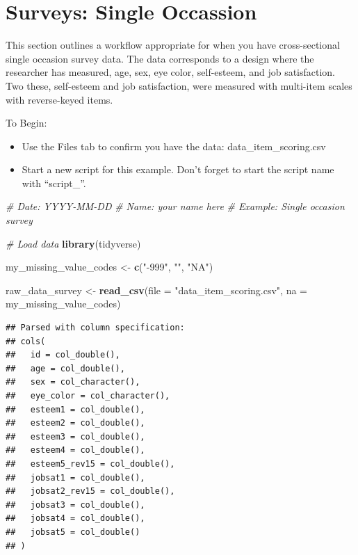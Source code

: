 \documentclass[
]{krantz}
\makeatletter
\newenvironment{Shaded}{\begin{snugshade}}{\end{snugshade}}
\newcommand{\CommentTok}[1]{\textcolor[rgb]{0.37,0.37,0.37}{\textit{#1}}}
\newcommand{\DataTypeTok}[1]{\textcolor[rgb]{0.27,0.27,0.27}{#1}}
\newcommand{\KeywordTok}[1]{\textcolor[rgb]{0.27,0.27,0.27}{\textbf{#1}}}
\newcommand{\NormalTok}[1]{#1}
\newcommand{\StringTok}[1]{\textcolor[rgb]{0.5,0.5,0.5}{#1}}
\newenvironment{kframe}{%
\medskip{}
\setlength{\fboxsep}{.8em}
 \def\at@end@of@kframe{}%
 \ifinner\ifhmode%
  \def\at@end@of@kframe{\end{minipage}}%
  \begin{minipage}{\columnwidth}%
 \fi\fi%
 \def\FrameCommand##1{\hskip\@totalleftmargin \hskip-\fboxsep
 \colorbox{shadecolor}{##1}\hskip-\fboxsep
     \hskip-\linewidth \hskip-\@totalleftmargin \hskip\columnwidth}%
 \MakeFramed {\advance\hsize-\width
   \@totalleftmargin\z@ \linewidth\hsize
   \@setminipage}}%
 {\par\unskip\endMakeFramed%
 \at@end@of@kframe}
\renewenvironment{Shaded}{\begin{kframe}}{\end{kframe}}
\makeatother
\begin{document}
\hypertarget{surveys-single-occassion}{%
\section{Surveys: Single Occassion}\label{surveys-single-occassion}}

This section outlines a workflow appropriate for when you have cross-sectional single occasion survey data. The data corresponds to a design where the researcher has measured, age, sex, eye color, self-esteem, and job satisfaction. Two these, self-esteem and job satisfaction, were measured with multi-item scales with reverse-keyed items.

To Begin:

\begin{itemize}
\item
  Use the Files tab to confirm you have the data: data\_item\_scoring.csv
\item
  Start a new script for this example. Don't forget to start the script name with ``script\_''.
\end{itemize}

\begin{Shaded}
\begin{Highlighting}[]
\CommentTok{# Date: YYYY-MM-DD}
\CommentTok{# Name: your name here}
\CommentTok{# Example: Single occasion survey}

\CommentTok{# Load data}
\KeywordTok{library}\NormalTok{(tidyverse)}

\NormalTok{my_missing_value_codes <-}\StringTok{ }\KeywordTok{c}\NormalTok{(}\StringTok{"-999"}\NormalTok{, }\StringTok{""}\NormalTok{, }\StringTok{"NA"}\NormalTok{)}

\NormalTok{raw_data_survey <-}\StringTok{ }\KeywordTok{read_csv}\NormalTok{(}\DataTypeTok{file =} \StringTok{"data_item_scoring.csv"}\NormalTok{,}
                     \DataTypeTok{na =}\NormalTok{ my_missing_value_codes)}
\end{Highlighting}
\end{Shaded}

\begin{verbatim}
## Parsed with column specification:
## cols(
##   id = col_double(),
##   age = col_double(),
##   sex = col_character(),
##   eye_color = col_character(),
##   esteem1 = col_double(),
##   esteem2 = col_double(),
##   esteem3 = col_double(),
##   esteem4 = col_double(),
##   esteem5_rev15 = col_double(),
##   jobsat1 = col_double(),
##   jobsat2_rev15 = col_double(),
##   jobsat3 = col_double(),
##   jobsat4 = col_double(),
##   jobsat5 = col_double()
## )
\end{verbatim}
\end{document}
